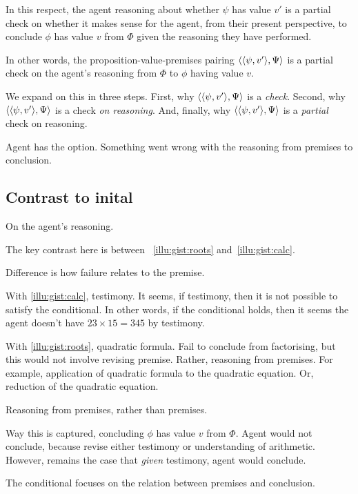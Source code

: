 \begin{note}
  In this respect, the agent reasoning about whether \(\psi\) has value \(v'\) is a partial check on whether it makes sense for the agent, from their present perspective, to conclude \(\phi\) has value \(v\) from \(\Phi\) given the reasoning they have performed.

  In other words, the proposition-value-premises pairing \(\langle \langle \psi, v' \rangle, \Psi \rangle\) is a partial check on the agent's reasoning from \(\Phi\) to \(\phi\) having value \(v\).

  We expand on this in three steps.
  First, why \(\langle \langle \psi, v' \rangle, \Psi \rangle\) is a \emph{check}.
  Second, why \(\langle \langle \psi, v' \rangle, \Psi \rangle\) is a check \emph{on reasoning}.
  And, finally, why \(\langle \langle \psi, v' \rangle, \Psi \rangle\) is a \emph{partial} check on reasoning.
\end{note}

\begin{note}[Check]
  Agent has the option.
  Something went wrong with the reasoning from premises to conclusion.
\end{note}

\subsection{Contrast to inital }

\begin{note}
  On the agent's reasoning.

  The key contrast here is between ~\ref{illu:gist:roots} and~\ref{illu:gist:calc}.

  Difference is how failure relates to the premise.

  With \autoref{illu:gist:calc}, testimony.
  It seems, if testimony, then it is not possible to satisfy the conditional.
  In other words, if the conditional holds, then it seems the agent doesn't have \(23 \times 15 = 345\) by testimony.

  With \autoref{illu:gist:roots}, quadratic formula.
  Fail to conclude from factorising, but this would not involve revising premise.
  Rather, reasoning from premises.
  For example, application of quadratic formula to the quadratic equation.
  Or, reduction of the quadratic equation.

  Reasoning from premises, rather than premises.

  Way this is captured, concluding \(\phi\) has value \(v\) from \(\Phi\).
  Agent would not conclude, because revise either testimony or understanding of arithmetic.
  However, remains the case that \emph{given} testimony, agent would conclude.

  The conditional focuses on the relation between premises and conclusion.
\end{note}

